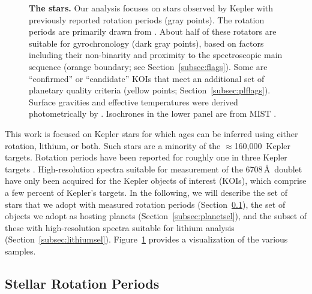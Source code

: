 \documentclass[11pt,twocolumn,tighten]{aastex63}
\newcommand{\nkeplerstars}{$\approx$160{,}000}
\begin{document}
\begin{figure}[!t]
	\begin{center}
	
		\vspace{-0.3cm}
	\end{center}
	\vspace{-0.5cm}
	\caption{{\bf The stars.}  Our analysis focuses on stars observed by Kepler
    with previously reported rotation periods (gray points).  The
    rotation periods are primarily drawn from
    \citet{Santos_2019,Santos_2021}.  About half of these rotators are
    suitable for gyrochronology (dark gray points), based on factors
    including their non-binarity and
    proximity to the spectroscopic main sequence (orange boundary; see Section~\ref{subsec:flags}).
    Some are ``confirmed'' or ``candidate'' KOIs
    that meet an additional set of planetary quality criteria (yellow
    points; Section~\ref{subsec:plflags}).  Surface gravities and
    effective temperatures were derived photometrically by
    \citet{Berger_2020a_catalog}.
    Isochrones 
    in the lower panel are from MIST \citep{Choi_2016} .
	}
	\label{fig:stellarprops}
\end{figure}

This work is focused on Kepler stars for which ages can be inferred
using either rotation, lithium, or both.  Such stars
are a minority of the \nkeplerstars\ Kepler targets.  Rotation periods
have been reported for roughly one in three Kepler targets
\citep[e.g.][]{McQuillan_2014,Santos_2021}.  High-resolution spectra
suitable for measurement of the  6708\,\AA\ doublet have
only been acquired for the Kepler objects of interest (KOIs), which
comprise a few percent of Kepler's targets.  In the following, we will
describe the set of stars that we adopt with measured rotation periods
(Section~\ref{subsec:rotsel}), the set of objects we adopt as hosting planets
(Section~\ref{subsec:planetsel}), and the subset of these with
high-resolution spectra suitable for lithium analysis
(Section~\ref{subsec:lithiumsel}).  Figure~\ref{fig:stellarprops}
provides a visualization of the various samples.


\subsection{Stellar Rotation Periods}
\label{subsec:rotsel}
\end{document}
